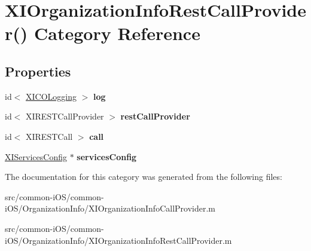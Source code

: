 \hypertarget{category_x_i_organization_info_rest_call_provider_07_08}{}\section{X\+I\+Organization\+Info\+Rest\+Call\+Provider() Category Reference}
\label{category_x_i_organization_info_rest_call_provider_07_08}
\subsection*{Properties}
\begin{DoxyCompactItemize}
\item 
\hypertarget{category_x_i_organization_info_rest_call_provider_07_08_ab7bfe01a5894cb18919549dfa3bfff87}{}\label{category_x_i_organization_info_rest_call_provider_07_08_ab7bfe01a5894cb18919549dfa3bfff87} 
id$<$ \hyperlink{protocol_x_i_c_o_logging-p}{X\+I\+C\+O\+Logging} $>$ {\bfseries log}
\item 
\hypertarget{category_x_i_organization_info_rest_call_provider_07_08_a89618a76938ed4ab0fdb7f0dfc59705f}{}\label{category_x_i_organization_info_rest_call_provider_07_08_a89618a76938ed4ab0fdb7f0dfc59705f} 
id$<$ X\+I\+R\+E\+S\+T\+Call\+Provider $>$ {\bfseries rest\+Call\+Provider}
\item 
\hypertarget{category_x_i_organization_info_rest_call_provider_07_08_a83c53c27a031945556c741028a9bf579}{}\label{category_x_i_organization_info_rest_call_provider_07_08_a83c53c27a031945556c741028a9bf579} 
id$<$ X\+I\+R\+E\+S\+T\+Call $>$ {\bfseries call}
\item 
\hypertarget{category_x_i_organization_info_rest_call_provider_07_08_a18636da1e6340c81e52aa24cc3ffeb8b}{}\label{category_x_i_organization_info_rest_call_provider_07_08_a18636da1e6340c81e52aa24cc3ffeb8b} 
\hyperlink{interface_x_i_services_config}{X\+I\+Services\+Config} $\ast$ {\bfseries services\+Config}
\end{DoxyCompactItemize}


The documentation for this category was generated from the following files\+:\begin{DoxyCompactItemize}
\item 
src/common-\/i\+O\+S/common-\/i\+O\+S/\+Organization\+Info/X\+I\+Organization\+Info\+Call\+Provider.\+m\item 
src/common-\/i\+O\+S/common-\/i\+O\+S/\+Organization\+Info/X\+I\+Organization\+Info\+Rest\+Call\+Provider.\+m\end{DoxyCompactItemize}

